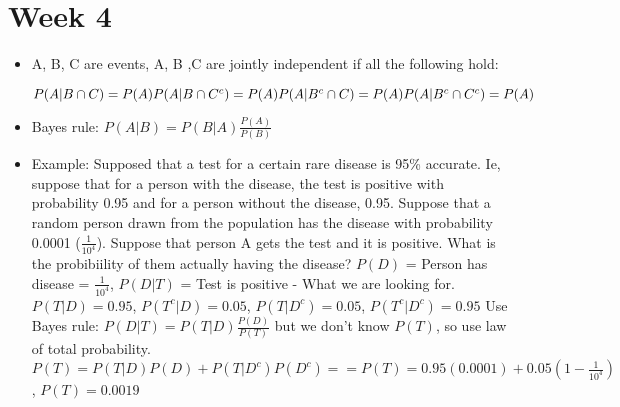 \documentclass[12pt]{article}
\begin{document}
    \section{Week 4}
    \begin{itemize}
        \setlength\itemsep{0.1em}
        \item A, B, C are events, A, B ,C are jointly independent if all the following hold: \newline
            \begin{fleqn}
                $
                P(A|B \cap C) = P(A) \newline
                P(A|B \cap C^c) = P(A) \newline
                P(A|B^c \cap C ) = P(A) \newline
                P(A|B^c \cap C^c) = P(A) \newline
                $
            \end{fleqn}
        \item Bayes rule: $P(A|B) = P(B|A)\frac{P(A)}{P(B)}$
        \item Example: Supposed that a test for a certain rare disease is 95\% accurate. Ie, suppose that for a person with the disease,
        the test is positive with probability 0.95 and for a person without the disease, 0.95. Suppose that a random person drawn from
        the population has the disease with probability 0.0001 ($\frac{1}{10^4}$). Suppose that person A gets the test and it is positive.
        What is the probibiility of them actually having the disease? \newline\newline
        $P(D)$ = Person has disease = $\frac{1}{10^4}$, $P(D|T)$ = Test is positive - What we are looking for. \newline
        $P(T|D) = 0.95$, $P(T^c|D) = 0.05$, $P(T|D^c) = 0.05$, $P(T^c|D^c) = 0.95$ \newline
        Use Bayes rule: $P(D|T) = P(T|D)\frac{P(D)}{P(T)}$ but we don't know $P(T)$, so use law of total probability. \newline
        $P(T) = P(T|D)P(D)+P(T|D^c)P(D^c) == P(T) = 0.95(0.0001) + 0.05(1-\frac{1}{10^4})$, $P(T) = 0.0019$
    \end{itemize}
\end{document}
